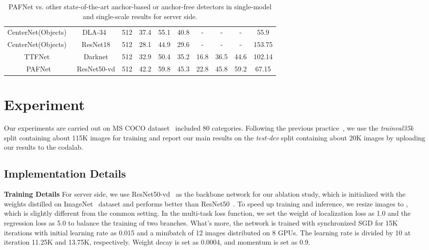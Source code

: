 \documentclass[10pt,twocolumn,letterpaper]{article}
\begin{document}
\begin{table*}
\begin{center}
{\begin{tabular}{c|c|c|c|c|c|c|c|c|c}
    CenterNet(Objects)~\cite{duan2019centernet}  &DLA-34~\cite{yu2018deep} & 512       & 37.4   & 55.1 & 40.8  & -     & -       & -      & 55.9         \\ 
    CenterNet(Objects)~\cite{duan2019centernet}  &ResNet18              & 512          & 28.1   & 44.9 & 29.6  & -     & -       & -      & 153.75       \\ \hline
    TTFNet~\cite{liu2020training}       &Darknet      & 512   & 32.9    & 50.4        & 35.2       & 16.8     & 36.5       & 44.6      & 102.14   \\ \hline
    PAFNet                           &ResNet50-vd   &512      & 42.2 & 59.8     & 45.3      &  22.8 & 45.8    & 59.2    & 67.15                 \\ \hline
    \end{tabular}
    }
    \end{center}
    \caption{PAFNet vs. other state-of-the-art anchor-based or anchor-free detectors in single-model and single-scale results for server side.}
    \label{table3}
    \end{table*}
    


    
	\section{Experiment}
Our experiments are carried out on MS COCO dataset~\cite{lin2014microsoft} included 80 categories. Following the previous practice~\cite{girshick2015fast, kong1904foveabox}, we use the \textit{trainval35k} split containing about 115K images for training and report our main results on the \textit{test-dev} split containing about 20K images by uploading our results to the codalab.
    
    \subsection{Implementation Details}
{\bf Training Details} For server side, we use ResNet50-vd~\cite{yu20201st} as the backbone network for our ablation study, which is initialized with the weights distilled on ImageNet~\cite{deng2009imagenet} dataset and performs better than ResNet50~\cite{akiba2017extremely}. To speed up training and inference, we resize images to  , which is slightly different from the common setting. In the multi-task loss function, we set the weight of localization loss as 1.0 and the regression loss as 5.0 to balance the training of two branches. What's more, the network is trained with synchronized SGD for 15K iterations with initial learning rate as 0.015 and a minibatch of 12 images distributed on 8 GPUs. The learning rate is divided by 10 at iteration 11.25K and 13.75K, respectively. Weight decay is set as 0.0004, and momentum is set as 0.9.
\end{document}
